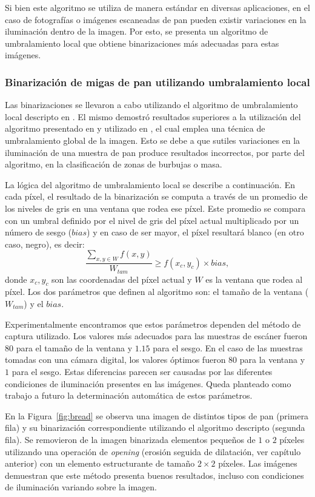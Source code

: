 Si bien este algoritmo se utiliza de manera estándar en diversas aplicaciones, en el caso de fotografías o imágenes escaneadas de pan pueden existir variaciones en la iluminación dentro de la imagen.
Por esto, se presenta un algoritmo de umbralamiento local que obtiene binarizaciones más adecuadas para estas imágenes. 


\subsubsection{Binarización de migas de pan utilizando umbralamiento local}
Las binarizaciones se llevaron a cabo utilizando el algoritmo de umbralamiento local descripto en \cite{White83}.
El mismo demostró resultados superiores a la utilización del algoritmo presentado en \cite{Huang95} y utilizado en \cite{Gonzales2008}, el cual emplea una técnica de umbralamiento global de la imagen.
Esto se debe a que sutiles variaciones en la iluminación de una muestra de pan produce resultados incorrectos, por parte del algoritmo, en la clasificación de zonas de burbujas o masa.


La lógica del algoritmo de umbralamiento local se describe a continuación.
En cada píxel, el resultado de la binarización se computa a través de un promedio de los niveles de gris en una ventana que rodea ese píxel. Este promedio se compara con un umbral definido por el nivel de gris del píxel actual multiplicado por un número de sesgo ($bias$) y en caso de ser mayor, el píxel resultará blanco (en otro caso, negro), es decir:
\begin{equation}
\frac{\sum_{x,y \in W} f(x,y) }{W_{tam}} \geq f(x_{c},y_{c}) \times bias,
\label{eqn:white}
\end{equation}
donde $x_{c},y_{c}$ son las coordenadas del píxel actual y  $W$ es la ventana que rodea al píxel. Los dos parámetros que definen al algoritmo son: el tamaño de la ventana ($W_{tam}$) y el $bias$. 

Experimentalmente encontramos que estos parámetros dependen del método de captura utilizado. Los valores más adecuados para las muestras de escáner fueron $80$ para el tamaño de la ventana y $1.15 $ para el sesgo. En el caso de las muestras tomadas con una cámara digital, los valores óptimos fueron $80$ para la ventana y $1$ para el sesgo.  Estas diferencias parecen ser causadas por las diferentes condiciones de iluminación presentes en las imágenes. Queda planteado como trabajo a futuro la determinación automática de estos parámetros.

En la Figura~\ref{fig:bread} se observa una imagen de distintos tipos de pan (primera fila) y su binarización correspondiente utilizando el algoritmo descripto (segunda fila).
Se removieron de la imagen binarizada elementos pequeños de $1$ o $2$ píxeles utilizando una operación de {\em opening} (erosión seguida de dilatación, ver capítulo anterior) con un elemento estructurante de tamaño $2\times 2$ píxeles.
Las imágenes demuestran que este método presenta buenos resultados, incluso con condiciones de iluminación variando sobre la imagen.

